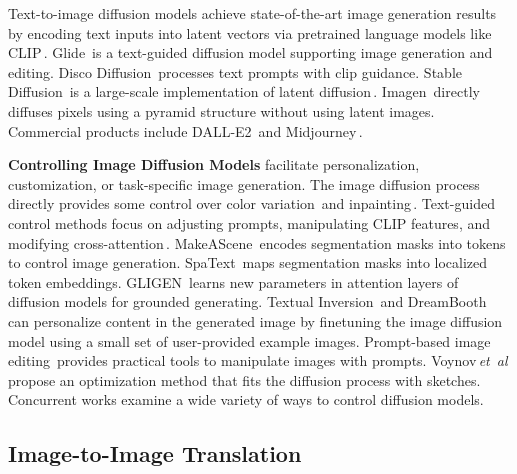 	Text-to-image diffusion models achieve state-of-the-art image generation results by encoding text inputs into latent vectors via pretrained language models like
	CLIP\,\cite{radford2021learning}.  Glide\,\cite{nichol2021glide} is a text-guided diffusion model supporting image generation and editing. Disco Diffusion\,\cite{disco} processes text prompts with clip guidance. Stable Diffusion\,\cite{sd15} is a large-scale implementation of latent diffusion\,\cite{rombach2021highresolution}.
	Imagen\,\cite{saharia2022photorealistic} directly diffuses pixels using a pyramid structure without using latent images.  Commercial products include DALL-E2\,\cite{DALLE2} and
	Midjourney\,\cite{midjourney}.

	\textbf{Controlling Image Diffusion Models} facilitate personalization, customization, or task-specific image generation.  The image diffusion process directly provides some control over color
	variation\,\cite{meng2021sdedit} and
	inpainting\,\cite{ramesh2022hierarchical,avrahami2022blended}.
	Text-guided control methods focus on adjusting prompts, manipulating CLIP features, and modifying
	cross-attention\,\cite{avrahami2022blended, brooks2022instructpix2pix, gafni2022make,hertz2022prompt, kawar2022imagic,kim2022diffusionclip, nichol2021glide,parmar2023zero,ramesh2022hierarchical}.
	MakeAScene\,\cite{gafni2022make} encodes segmentation masks into tokens to control image generation.
	SpaText\,\cite{avrahami2022spatext} maps segmentation masks into localized token embeddings.  GLIGEN\,\cite{li2023gligen} learns new parameters in attention layers of diffusion models for grounded generating.  Textual Inversion\,\cite{gal2022image} and
	DreamBooth\,\cite{ruiz2022dreambooth} can personalize content in the generated image by finetuning the image diffusion model using a small set of user-provided example images.  Prompt-based image
	editing\,\cite{brooks2022instructpix2pix,huang2023region,pnpDiffusion2022}
	provides practical tools to manipulate images with prompts.
	Voynov\,\emph{et~al}\onedot\,\cite{voynov2022sketch} propose an optimization method that fits the diffusion process with sketches.  Concurrent works \cite{bar2023multidiffusion,bashkirova2023masksketch,lhhuang2023composer,mou2023t2i} examine a wide variety of ways to control diffusion models.

	\subsection{Image-to-Image Translation}

